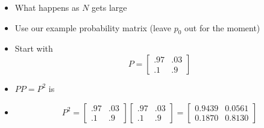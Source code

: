 \documentclass[notes=show]{beamer}
\begin{document}
\begin{frame}%


\begin{itemize}
\item What happens as $N$ gets large

\item Use our example probability matrix (leave $p_{0}$ out for the moment)

\item Start with%
\[
P=\left[ 
\begin{array}{cc}
.97 & .03 \\ 
.1 & .9%
\end{array}%
\right] 
\]

\item $PP=P^{2}$ is

\item 
\[
P^{2}=\left[ 
\begin{array}{cc}
.97 & .03 \\ 
.1 & .9%
\end{array}%
\right] \left[ 
\begin{array}{cc}
.97 & .03 \\ 
.1 & .9%
\end{array}%
\right] =\left[ 
\begin{array}{cc}
0.9439 & 0.0561 \\ 
0.1870 & 0.8130%
\end{array}%
\right] 
\]
\end{itemize}

\end{frame}%
\end{document}
